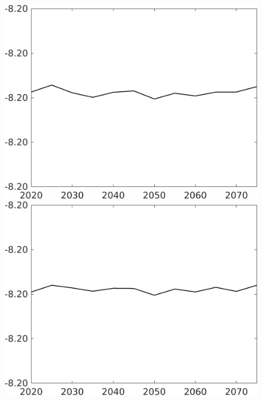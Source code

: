 \documentclass[12pt]{article}
\begin{document}
\begin{figure}[h!!]
\begin{minipage}[]{0.32\textwidth}
	\end{minipage}	
	\begin{minipage}[]{0.32\textwidth}
		\includegraphics[width=1\textwidth]{../../codding_model/own_basedOnFried/optimalPol_010922_revision/figures/all_13Sept22/CompTaul_Equlab_LFBAUPer_Reg0_F_spillover0_nsk1_xgr0_knspil1_sep1_countec0_GovRev0_etaa0.79.png}
	\end{minipage}	
	\begin{minipage}[]{0.32\textwidth}
		\includegraphics[width=1\textwidth]{../../codding_model/own_basedOnFried/optimalPol_010922_revision/figures/all_13Sept22/CompTaul_Equlab_LFBAUPer_Reg0_G_spillover0_nsk1_xgr0_knspil1_sep1_countec0_GovRev0_etaa0.79.png}

\end{minipage}
\end{figure}
\end{document}
